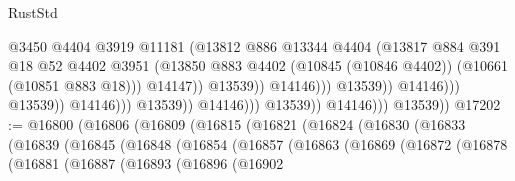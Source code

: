 \begin{lexlean}{RustStd}
\begin{coremodule}
                                                          @3450
                                                          @4404
                                                          @3919
                                                          @11181
                                                          (@13812
                                                            @886
                                                            @13344
                                                            @4404
                                                            (@13817
                                                              @884
                                                              @391
                                                              @18
                                                              @52
                                                              @4402
                                                              @3951
                                                              (@13850
                                                                @883
                                                                @4402
                                                                (@10845 (@10846 @4402))
                                                                (@10661 (@10851 @883 @18)))
                                                              @14147))
                                                          @13539))
                                                      @14146)))
                                                @13539))
                                            @14146)))
                                      @13539))
                                  @14146)))
                            @13539))
                        @14146)))
                  @13539))
              @14146)))
        @13539))
@17202 := @16800
    (@16806
      (@16809
        (@16815
          (@16821
            (@16824
              (@16830
                (@16833
                  (@16839
                    (@16845
                      (@16848
                        (@16854
                          (@16857
                            (@16863
                              (@16869
                                (@16872
                                  (@16878
                                    (@16881
                                      (@16887
                                        (@16893
                                          (@16896
                                            (@16902

\end{coremodule}
\end{lexlean}
